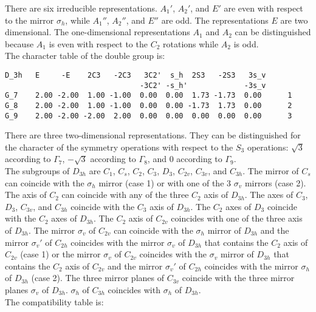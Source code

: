 \documentclass[12pt,a4paper,twoside]{report}
\begin{document}
There are six irreducible representations. $A_1'$, $A_2'$, and $E'$ are
even with respect to the mirror $\sigma_h$, while
$A_1''$, $A_2''$, and $E''$ are odd. The representations $E$ are
two dimensional. The one-dimensional representations $A_1$ and $A_2$ can
be distinguished because $A_1$ is even with respect to the $C_2$ rotations
while $A_2$ is odd. \\
The character table of the double group is:
\begin{tcolorbox}
\begin{footnotesize}
\begin{verbatim}
D_3h   E     -E    2C3   -2C3   3C2'  s_h  2S3   -2S3   3s_v
                               -3C2' -s_h'             -3s_v
G_7    2.00 -2.00  1.00 -1.00  0.00  0.00  1.73 -1.73  0.00      1
G_8    2.00 -2.00  1.00 -1.00  0.00  0.00 -1.73  1.73  0.00      2
G_9    2.00 -2.00 -2.00  2.00  0.00  0.00  0.00  0.00  0.00      3
\end{verbatim}
\end{footnotesize}
\end{tcolorbox}

There are three two-dimensional representations. They can be distinguished
for the character of the symmetry operations with respect to the $S_3$
operations: $\sqrt{3}$ according to $\Gamma_7$, $-\sqrt{3}$ according
to $\Gamma_8$, and $0$ according to $\Gamma_9$. \\
The subgroups of $D_{3h}$ are $C_1$, $C_s$, $C_2$, $C_3$, $D_3$, $C_{2v}$, 
$C_{3v}$, and $C_{3h}$. The mirror of $C_s$ can coincide with the $\sigma_h$ mirror 
(case 1) or with one of the $3$ $\sigma_v$ mirrors (case 2). 
The axis of $C_2$ can coincide with any of the three $C_2$ axis of $D_{3h}$. 
The axes of $C_3$, $D_3$, $C_{3v}$, and $C_{3h}$ coincide with the $C_3$ axis 
of $D_{3h}$. The $C_2$ axes of $D_3$ coincide
with the $C_2$ axes of $D_{3h}$. 
The $C_2$ axis of $C_{2v}$ coincides with one of the three axis of $D_{3h}$.
The mirror $\sigma_v$ of $C_{2v}$ can coincide with the $\sigma_h$ mirror of $D_{3h}$
and the mirror $\sigma_v'$ of $C_{2h}$ coincides with the mirror $\sigma_v$ 
of $D_{3h}$ that contains the $C_2$ axis of $C_{2v}$ (case 1) or
the mirror $\sigma_v$ of $C_{2v}$ coincides with the $\sigma_v$ mirror of $D_{3h}$
that contains the $C_2$ axis of $C_{2v}$ and the mirror $\sigma_v'$ of $C_{2h}$ 
coincides with the mirror $\sigma_h$ of $D_{3h}$ (case 2). 
The three mirror planes of $C_{3v}$ coincide with the three mirror planes
$\sigma_v$ of $D_{3h}$. $\sigma_h$ of $C_{3h}$ coincides
with $\sigma_h$ of $D_{3h}$. \\
The compatibility table is:
\end{document}
